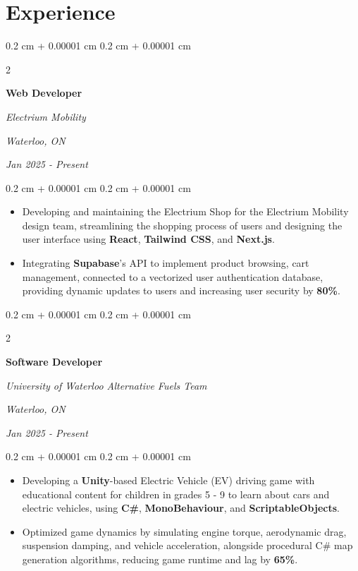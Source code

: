 \documentclass[10pt, letterpaper]{article}
\newenvironment{highlights}{
    \begin{itemize}[
        topsep=0.10 cm,
        parsep=0.10 cm,
        partopsep=0pt,
        itemsep=0pt,
        leftmargin=0.4 cm + 10pt
    ]
}{
    \end{itemize}
} %
\newenvironment{onecolentry}{
    \begin{adjustwidth}{
        0.2 cm + 0.00001 cm
    }{
        0.2 cm + 0.00001 cm
    }
}{
    \end{adjustwidth}
} %
\newenvironment{twocolentry}[2][]{
    \onecolentry
    \def\secondColumn{#2}
    \setcolumnwidth{\fill, 4.5 cm}
    \begin{paracol}{2}
}{
    \switchcolumn \raggedleft \secondColumn
    \end{paracol}
    \endonecolentry
} %
\begin{document}
    \section{Experience}

        \begin{twocolentry}{
        \textit{Waterloo, ON}    
            
        \textit{Jan 2025 - Present}}
            \textbf{Web Developer}
            
            \textit{Electrium Mobility
}
        \end{twocolentry}

        \vspace{0.10 cm}
        \begin{onecolentry}
            \begin{highlights}
                \item Developing and maintaining the Electrium Shop for the Electrium Mobility design team, streamlining the shopping process of users and designing the user interface using \textbf{React}, \textbf{Tailwind CSS}, and \textbf{Next.js}.
                \item Integrating \textbf{Supabase}'s API to implement product browsing, cart management, connected to a vectorized user authentication database, providing dynamic updates to users and increasing user security by \textbf{80\%}.
            \end{highlights}
        \end{onecolentry}

        \vspace{0.2 cm}

        
        \begin{twocolentry}{
        \textit{Waterloo, ON}    
            
        \textit{Jan 2025 - Present}}
            \textbf{Software Developer}
            
            \textit{University of Waterloo Alternative Fuels Team}
        \end{twocolentry}

        \vspace{0.10 cm}
        \begin{onecolentry}
            \begin{highlights}
                \item Developing a \textbf{Unity}-based Electric Vehicle (EV) driving game with educational content for children in grades 5 - 9 to learn about cars and electric vehicles, using \textbf{C\#}, \textbf{MonoBehaviour}, and \textbf{ScriptableObjects}.
                \item Optimized game dynamics by simulating engine torque, aerodynamic drag, suspension damping, and vehicle acceleration, alongside procedural C\# map generation algorithms, reducing game runtime and lag by \textbf{65\%}.
 
            \end{highlights}
        \end{onecolentry}
        
\end{document}

